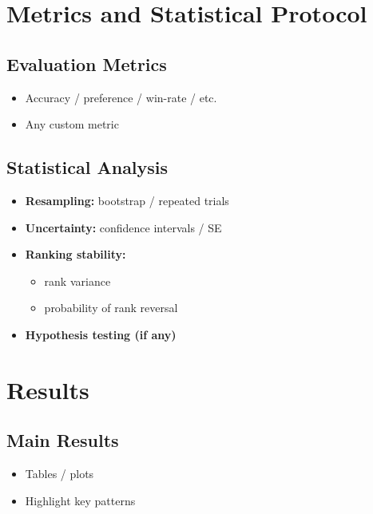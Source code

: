 \documentclass[11pt]{article}
\begin{document}
\section{Metrics and Statistical Protocol}

\subsection{Evaluation Metrics}

\begin{itemize}
    \item Accuracy / preference / win-rate / etc.
    \item Any custom metric
\end{itemize}

\subsection{Statistical Analysis}

\begin{itemize}[leftmargin=*]
    \item \textbf{Resampling:} bootstrap / repeated trials
    \item \textbf{Uncertainty:} confidence intervals / SE
    \item \textbf{Ranking stability:}
    \begin{itemize}
        \item rank variance
        \item probability of rank reversal
    \end{itemize}
    \item \textbf{Hypothesis testing (if any)}
\end{itemize}

\section{Results}

\subsection{Main Results}

\begin{itemize}
    \item Tables / plots
    \item Highlight key patterns
\end{itemize}
\end{document}
